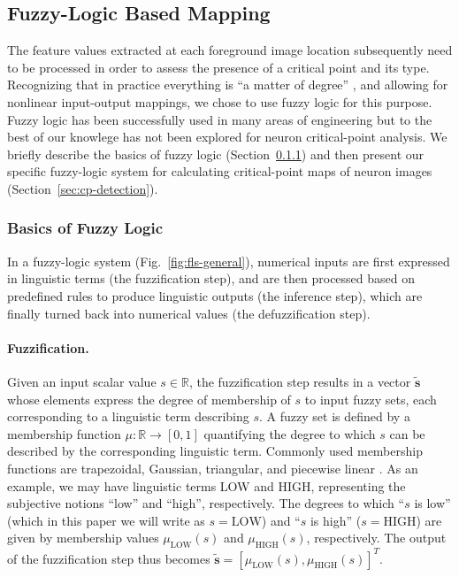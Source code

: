 \subsection{Fuzzy-Logic Based Mapping}
\label{subsec:flrb-detection}
The feature values extracted at each foreground image location subsequently need to be processed in order to assess the presence of a critical point and its type. Recognizing that in practice everything is ``a matter of degree'' \cite{zadeh1975fuzzy}, and allowing for nonlinear input-output mappings, we chose to use fuzzy logic for this purpose. Fuzzy logic has been successfully used in many areas of engineering \cite{mendel1995fuzzy} but to the best of our knowlege has not been explored for neuron critical-point analysis. We briefly describe the basics of fuzzy logic (Section~\ref{sec:FL}) and then present our specific fuzzy-logic system for calculating critical-point maps of neuron images (Section~\ref{sec:cp-detection}).

\subsubsection{Basics of Fuzzy Logic}
\label{sec:FL}
In a fuzzy-logic system (Fig.~\ref{fig:fls-general}), numerical inputs are first expressed in linguistic terms (the fuzzification step), and are then processed based on predefined rules to produce linguistic outputs (the inference step), which are finally turned back into numerical values (the defuzzification step).

\paragraph{Fuzzification.} Given an input scalar value $s\in\mathbb{R}$, the fuzzification step results in a vector $\tilde{\mathbf{s}}$ whose elements express the degree of membership of $s$  to input fuzzy sets, each corresponding to a linguistic term describing $s$. A fuzzy set is defined by a membership function $\mu:\mathbb{R}\rightarrow[0,1]$ quantifying the degree to which $s$ can be described by the corresponding linguistic term. Commonly used membership functions are trapezoidal, Gaussian, triangular, and piecewise linear \cite{mendel1995fuzzy}. As an example, we may have linguistic terms LOW and HIGH, representing the subjective notions ``low'' and ``high'', respectively. The degrees to which ``$s$ is low'' (which in this paper we will write as $s=\textrm{LOW}$) and ``$s$ is high'' ($s=\textrm{HIGH}$) are given by membership values $\mu_{\textrm{LOW}}(s)$ and $\mu_{\textrm{HIGH}}(s)$, respectively. The output of the fuzzification step thus becomes $\tilde{\mathbf{s}}=[\mu_{\textrm{LOW}}(s),\mu_{\textrm{HIGH}}(s)]^{T}$.

